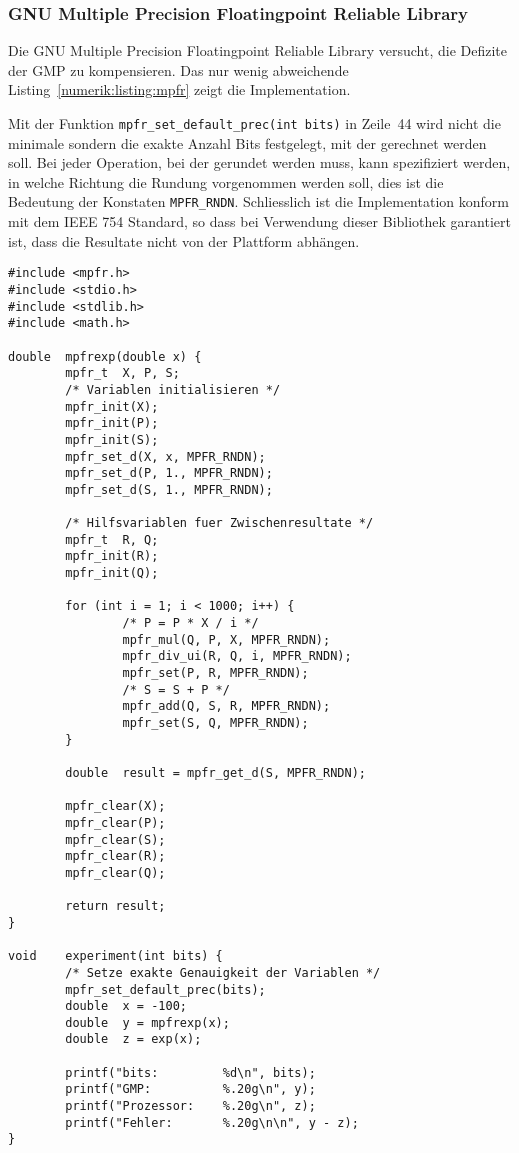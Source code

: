 \subsubsection{GNU Multiple Precision Floatingpoint Reliable Library}
%
%
Die GNU Multiple Precision Floatingpoint Reliable Library versucht,
die Defizite der GMP zu kompensieren.
Das nur wenig abweichende Listing~\ref{numerik:listing:mpfr} zeigt
die Implementation.

Mit der Funktion \verb+mpfr_set_default_prec(int bits)+ in Zeile~44
wird nicht die minimale sondern die exakte Anzahl Bits festgelegt,
mit der gerechnet werden soll.
Bei jeder Operation, bei der gerundet werden muss, kann spezifiziert
werden, in welche Richtung die Rundung vorgenommen werden soll, dies
ist die Bedeutung der Konstaten \verb+MPFR_RNDN+.
Schliesslich ist die Implementation konform mit dem IEEE 754 Standard,
so dass bei Verwendung dieser Bibliothek garantiert ist, dass die
Resultate nicht von der Plattform abhängen.
%

\begin{lstlisting}[float,style=C,caption={C-Programm zur Berechnung von $e^x$ mit Hilfe der Taylor-Reihe, implementiert mit MPFR},label={numerik:listing:mpfr}]
#include <mpfr.h>
#include <stdio.h>
#include <stdlib.h>
#include <math.h>

double  mpfrexp(double x) {
        mpfr_t  X, P, S;
        /* Variablen initialisieren */
        mpfr_init(X);
        mpfr_init(P);
        mpfr_init(S);
        mpfr_set_d(X, x, MPFR_RNDN);
        mpfr_set_d(P, 1., MPFR_RNDN);
        mpfr_set_d(S, 1., MPFR_RNDN);

        /* Hilfsvariablen fuer Zwischenresultate */
        mpfr_t  R, Q;
        mpfr_init(R);
        mpfr_init(Q);

        for (int i = 1; i < 1000; i++) {
                /* P = P * X / i */
                mpfr_mul(Q, P, X, MPFR_RNDN);
                mpfr_div_ui(R, Q, i, MPFR_RNDN);
                mpfr_set(P, R, MPFR_RNDN);
                /* S = S + P */
                mpfr_add(Q, S, R, MPFR_RNDN);
                mpfr_set(S, Q, MPFR_RNDN);
        }

        double  result = mpfr_get_d(S, MPFR_RNDN);

        mpfr_clear(X);
        mpfr_clear(P);
        mpfr_clear(S);
        mpfr_clear(R);
        mpfr_clear(Q);

        return result;
}

void    experiment(int bits) {
        /* Setze exakte Genauigkeit der Variablen */
        mpfr_set_default_prec(bits);
        double  x = -100;
        double  y = mpfrexp(x);
        double  z = exp(x);

        printf("bits:         %d\n", bits);
        printf("GMP:          %.20g\n", y);
        printf("Prozessor:    %.20g\n", z);
        printf("Fehler:       %.20g\n\n", y - z);
}
\end{lstlisting}


